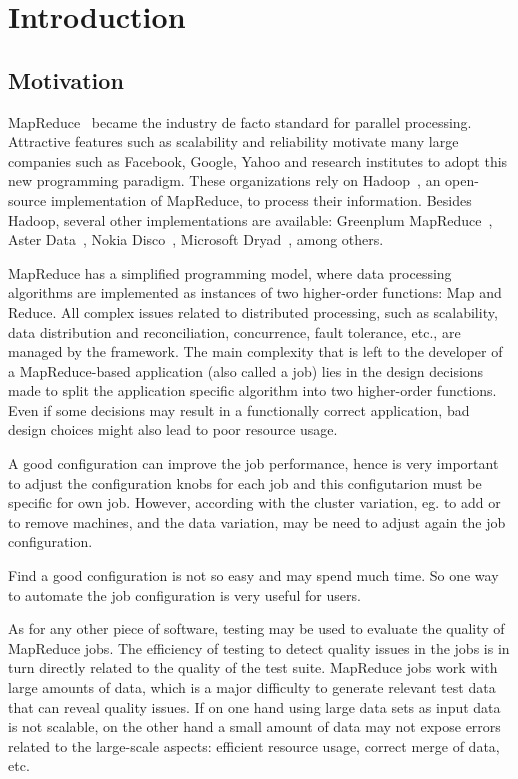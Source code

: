 \chapter{Introduction} %
\label{cha:introduction}

\section{Motivation}

MapReduce~\cite{Dean:2004} became the industry de facto standard for parallel processing. Attractive features such as scalability and reliability motivate many large companies such as Facebook, Google, Yahoo and research institutes to adopt this new programming paradigm. 
These organizations rely on Hadoop~\cite{White:2009}, an open-source implementation of MapReduce, to process their information.
Besides Hadoop, several other implementations are available: Greenplum MapReduce~\cite{Greenplum:2008}, Aster Data~\cite{Aster:2011}, Nokia Disco~\cite{Mundkur:2011},  Microsoft Dryad~\cite{Isard:2007}, among others. 

MapReduce has a simplified programming model, where data processing algorithms are implemented as instances of two higher-order functions: Map and Reduce. All complex issues related to distributed processing, such as scalability, data distribution and reconciliation, concurrence, fault tolerance, etc., are managed by the framework. 
The main complexity that is left to the developer of a MapReduce-based application (also called a job) lies in the design decisions made to split the application specific algorithm into two higher-order functions. Even if some decisions may result in a functionally correct application, bad design choices might also lead to poor resource usage.

A good configuration can improve the job performance, hence is very
important to adjust the configuration knobs for each job and this configutarion
must be specific for own job. However, according with the cluster variation,
eg. to add or to remove machines, and the data variation, may be need to
adjust again the job configuration.

Find a good configuration is not so easy and may spend much time. So 
one way to automate the job configuration is very useful for users.


As for any other piece of software, testing may be used to evaluate the quality of MapReduce jobs. The efficiency of testing to detect quality issues in the jobs is in turn directly related to the quality of the test suite. MapReduce jobs work with large amounts of data, which is a major difficulty to generate relevant test data that can reveal quality issues. If on one hand using large data sets as input data is not scalable, on the other hand a small amount of data may not expose errors related to the large-scale aspects: efficient resource usage, correct merge of data, etc.

